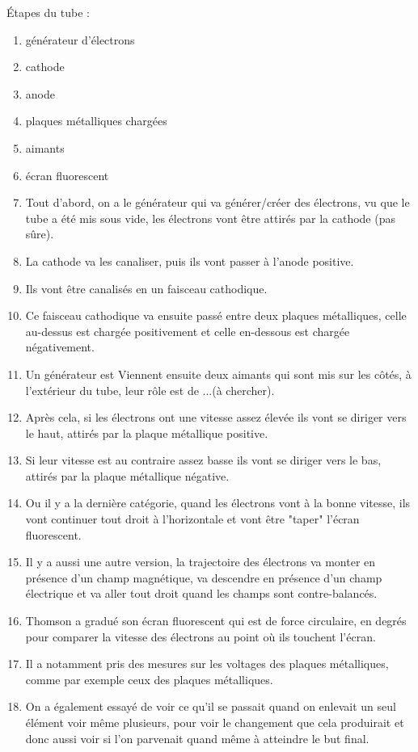 \documentclass[../main.tex]{subfiles}
\begin{document}
Étapes du tube : \\
\begin{enumerate}
    \item générateur d'électrons
    \item cathode
    \item anode
    \item plaques métalliques chargées
    \item aimants
    \item écran fluorescent
    \item Tout d'abord, on a le générateur qui va générer/créer des électrons, vu que le tube a été mis sous vide, les électrons vont être attirés par la cathode (pas sûre).
    \item  La cathode va les canaliser, puis ils vont passer à l'anode positive.
    \item  Ils vont être canalisés en un faisceau cathodique.\\
    \item Ce faisceau cathodique va ensuite passé entre deux plaques métalliques, celle au-dessus est chargée positivement et celle en-dessous est chargée négativement.
    \item  Un générateur est Viennent ensuite deux aimants qui sont mis sur les côtés, à l'extérieur du tube, leur rôle est de ...(à chercher).
    \item Après cela, si les électrons ont une vitesse assez élevée ils vont se diriger vers le haut, attirés par la plaque métallique positive.
    \item  Si leur vitesse est au contraire assez basse ils vont se diriger vers le bas, attirés par la plaque métallique négative.
    \item Ou il y a la dernière catégorie, quand les électrons vont à la bonne vitesse, ils vont continuer tout droit à l'horizontale et vont être "taper" l'écran fluorescent.
    \item Il y a aussi une autre version, la trajectoire des électrons va monter en présence d'un champ magnétique, va descendre en présence d'un champ électrique et  va aller tout droit quand les champs sont contre-balancés. 
    \item Thomson a gradué son écran fluorescent qui est de force circulaire, en degrés pour comparer la vitesse des électrons au point où ils touchent l'écran. 
    \item Il a notamment pris des mesures sur les voltages des plaques métalliques, comme par exemple ceux des plaques métalliques. 
    \item On a également essayé de voir ce qu'il se passait quand on enlevait un seul élément voir même plusieurs, pour voir le changement que cela produirait et donc aussi voir si l'on parvenait quand même à atteindre le but final.

\end{enumerate}
\end{document}
